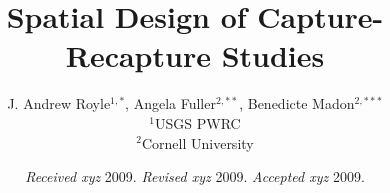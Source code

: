 \documentclass[useAMS,referee]{biom}
\title[Spatial Capture-Recapture]{
Spatial Design of Capture-Recapture Studies
}
\author{
J. Andrew Royle$^{1,*}$\email{aroyle@usgs.gov},
Angela Fuller$^{2,**}$\email{afuller@cornell.edu},
Benedicte Madon$^{2,***}$\email{bmadon@cornell.edu} \\
$^{1}$USGS PWRC \\
$^{2}$Cornell University 
}
\begin{document}
\linenumbers


\date{{\it Received xyz} 2009. {\it Revised xyz} 2009.  {\it
Accepted xyz} 2009.}



\pagerange{\pageref{firstpage}--\pageref{lastpage}} 




\label{firstpage}

\end{document}

